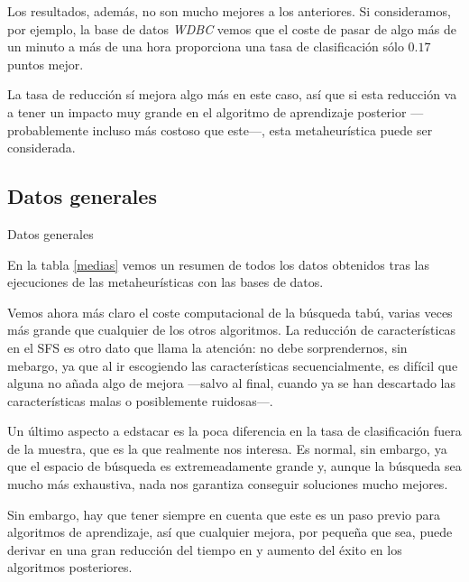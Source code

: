 \documentclass[a4paper, 11pt, titlepage]{article}
\begin{document}
    Los resultados, además, no son mucho mejores a los anteriores. Si consideramos, por ejemplo, la base de datos \emph{WDBC} vemos que el coste de pasar de algo más de un minuto a más de una hora proporciona una tasa de clasificación sólo $0.17$ puntos mejor.

    La tasa de reducción sí mejora algo más en este caso, así que si esta reducción va a tener un impacto muy grande en el algoritmo de aprendizaje posterior ---probablemente incluso más costoso que este---, esta metaheurística puede ser considerada.

    \subsection{Datos generales}
    \begin{table}[!htb]
        \maketablemean{\dataMedias}
        \caption{Datos generales}
        \label{medias}
    \end{table}

    En la tabla \ref{medias} vemos un resumen de todos los datos obtenidos tras las ejecuciones de las metaheurísticas con las bases de datos.

    Vemos ahora más claro el coste computacional de la búsqueda tabú, varias veces más grande que cualquier de los otros algoritmos. La reducción de características en el SFS es otro dato que llama la atención: no debe sorprendernos, sin mebargo, ya que al ir escogiendo las características secuencialmente, es difícil que alguna no añada algo de mejora ---salvo al final, cuando ya se han descartado las características malas o posiblemente ruidosas---.

    Un último aspecto a edstacar es la poca diferencia en la tasa de clasificación fuera de la muestra, que es la que realmente nos interesa. Es normal, sin embargo, ya que el espacio de búsqueda es extremeadamente grande y, aunque la búsqueda sea mucho más exhaustiva, nada nos garantiza conseguir soluciones mucho mejores.

    Sin embargo, hay que tener siempre en cuenta que este es un paso previo para algoritmos de aprendizaje, así que cualquier mejora, por pequeña que sea, puede derivar en una gran reducción del tiempo en y aumento del éxito en los algoritmos posteriores.
\end{document}

